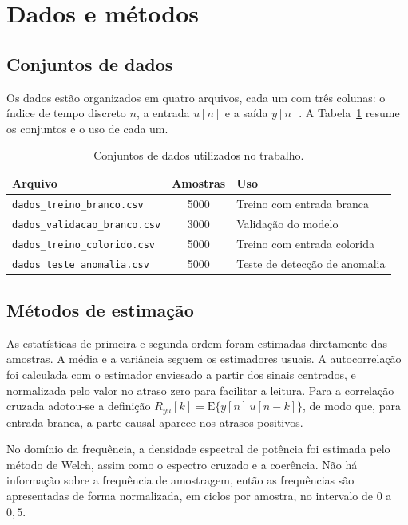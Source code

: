\section{Dados e métodos}

\subsection{Conjuntos de dados}

Os dados estão organizados em quatro arquivos, cada um com três colunas: o índice de
tempo discreto $n$, a entrada $u[n]$ e a saída $y[n]$. A Tabela~\ref{tab:dados}
resume os conjuntos e o uso de cada um.

\begin{table}[H]
\centering
\caption{Conjuntos de dados utilizados no trabalho.}
\label{tab:dados}
\begin{tabular}{lcl}
\toprule
Arquivo & Amostras & Uso \\
\midrule
\texttt{dados\_treino\_branco.csv}    & 5000 & Treino com entrada branca \\
\texttt{dados\_validacao\_branco.csv} & 3000 & Validação do modelo \\
\texttt{dados\_treino\_colorido.csv}  & 5000 & Treino com entrada colorida \\
\texttt{dados\_teste\_anomalia.csv}   & 5000 & Teste de detecção de anomalia \\
\bottomrule
\end{tabular}
\end{table}

\subsection{Métodos de estimação}

As estatísticas de primeira e segunda ordem foram estimadas diretamente das amostras.
A média e a variância seguem os estimadores usuais. A autocorrelação foi calculada
com o estimador enviesado a partir dos sinais centrados, e normalizada pelo valor no
atraso zero para facilitar a leitura. Para a correlação cruzada adotou-se a definição
$R_{yu}[k] = \mathrm{E}\{y[n]\,u[n-k]\}$, de modo que, para entrada branca, a parte
causal aparece nos atrasos positivos.

No domínio da frequência, a densidade espectral de potência foi estimada pelo método
de Welch, assim como o espectro cruzado e a coerência. Não há informação sobre a
frequência de amostragem, então as frequências são apresentadas de forma normalizada,
em ciclos por amostra, no intervalo de $0$ a $0{,}5$.

